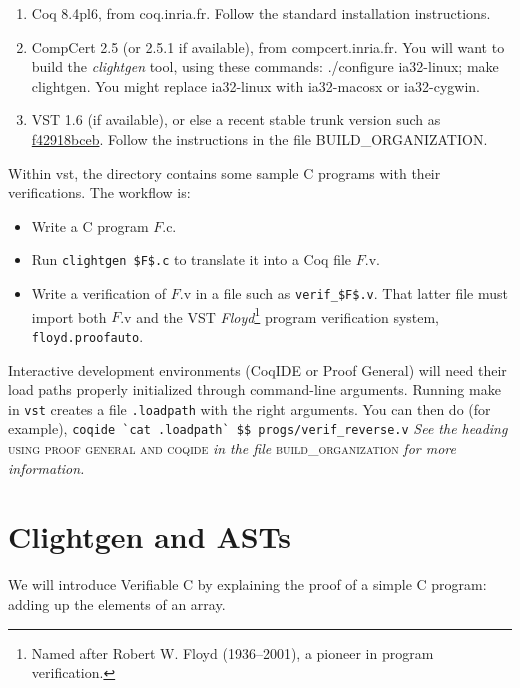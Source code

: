 \documentclass[12pt,fleqn,openany,oneside,showtrims]{memoir}
\begin{document}
\begin{enumerate}
\item Coq 8.4pl6, from coq.inria.fr.  Follow the standard installation instructions.
\item CompCert 2.5 (or 2.5.1 if available), from compcert.inria.fr.
  You will want to build the \emph{clightgen} tool, using these commands:
  \textsf{./configure ia32-linux; make clightgen}.  You might replace
  ia32-linux with ia32-macosx or ia32-cygwin.
\item VST 1.6 (if available), or else a recent
  stable trunk version such as
  \href{https://github.com/PrincetonUniversity/VST/archive/f42918bceb828706f4274705613f7e4e644557ce.zip}{f42918bceb}.  Follow the instructions in the file BUILD\_ORGANIZATION.
\end{enumerate}  


Within vst, the  directory contains some sample C programs
with their verifications.  The workflow is:
\begin{itemize}
\item Write a C program $F$.c.
\item Run \lstinline{clightgen $F$.c} to translate it into a Coq
file $F$.v.
\item Write a verification of $F$.v in a file such as
\lstinline{verif_$F$.v}.  That latter file must import
both $F$.v and the VST \emph{Floyd}\footnote{Named after Robert W. Floyd (1936--2001), a pioneer in program verification.} program verification system,
\lstinline{floyd.proofauto}.
\end{itemize}

Interactive development environments (CoqIDE or Proof General)
will need their load paths properly initialized through 
command-line arguments.  Running \textsf{make} in 
\lstinline{vst} creates a file \lstinline{.loadpath} with
the right arguments.  You can then do (for example),
\newline
\lstinline{coqide `cat .loadpath` $$ progs/verif_reverse.v}
\newline
\emph{See the heading} 
\textsc{using proof general and coqide}
\emph{in the file} \textsc{build\_organization}
\emph{for more information.}

\chapter{Clightgen and ASTs}

We will introduce Verifiable C by explaining the
proof of a simple C program:  adding up the elements of an array.
\end{document}
